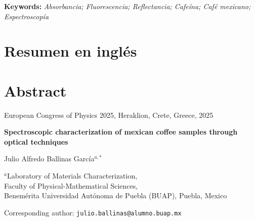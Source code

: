 \documentclass{article}
\newcommand{\PaperTitle}{}        %
\newcommand{\PaperAuthors}{}      %
\newcommand{\PaperAffils}{}       %
\newcommand{\PaperDates}{}        %
\newcommand{\PaperJournal}{}      %
\newcommand{\keywords}[1]{%
  \par\smallskip\noindent\textbf{Keywords:} \textit{#1}\par
}
\begin{document}
\keywords{Absorbancia; Fluorescencia; Reflectancia; Cafeína; Café mexicano; Espectroscopía}

\section{Resumen en inglés}

\section{Abstract}

\renewcommand{\PaperJournal}{European Congress of Physics 2025, Heraklion, Crete, Greece, 2025}
\renewcommand{\PaperTitle}{Spectroscopic characterization of mexican coffee samples through optical techniques}
\renewcommand{\PaperAuthors}{Julio Alfredo Ballinas García$^{a,*}$}
\renewcommand{\PaperAffils}{$^{a}$Laboratory of Materials Characterization, \\
Faculty of Physical-Mathematical Sciences, \\
Benemérita Universidad Autónoma de Puebla (BUAP), Puebla, Mexico}
\renewcommand{\PaperDates}{Corresponding author: \texttt{julio.ballinas@alumno.buap.mx}}

\begin{articleheader}
  {\small\PaperJournal\par}
  {\Large\bfseries \PaperTitle\par}
  \vspace{4pt}
  {\normalsize \PaperAuthors\par}
  {\footnotesize \PaperAffils\par}
  {\scriptsize \PaperDates\par}
\end{articleheader}
\end{document}
